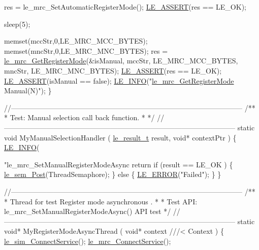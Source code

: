 \begin{DoxyCodeInclude}
{{{{{    res = le\_mrc\_SetAutomaticRegisterMode();
    \hyperlink{le__log_8h_ac0dbbef91dc0fed449d0092ff0557b39}{LE\_ASSERT}(res == LE\_OK);

    sleep(5);

    memset(mccStr,0,LE\_MRC\_MCC\_BYTES);
    memset(mncStr,0,LE\_MRC\_MNC\_BYTES);
    res = \hyperlink{le__mrc__interface_8h_a9ad2729c28e97ae450f7aee0865197f6}{le\_mrc\_GetRegisterMode}(&isManual, mccStr, LE\_MRC\_MCC\_BYTES, mncStr, 
      LE\_MRC\_MNC\_BYTES);
    \hyperlink{le__log_8h_ac0dbbef91dc0fed449d0092ff0557b39}{LE\_ASSERT}(res == LE\_OK);
    \hyperlink{le__log_8h_ac0dbbef91dc0fed449d0092ff0557b39}{LE\_ASSERT}(isManual == false);
    \hyperlink{le__log_8h_a23e6d206faa64f612045d688cdde5808}{LE\_INFO}("\hyperlink{le__mrc__interface_8h_a9ad2729c28e97ae450f7aee0865197f6}{le\_mrc\_GetRegisterMode} Manual(N)");
\}

\textcolor{comment}{//--------------------------------------------------------------------------------------------------}\textcolor{comment}{}
\textcolor{comment}{/**}
\textcolor{comment}{ * Test: Manual selection call back function.}
\textcolor{comment}{ *}
\textcolor{comment}{ */}
\textcolor{comment}{//--------------------------------------------------------------------------------------------------}
static \textcolor{keywordtype}{void} MyManualSelectionHandler
(
    \hyperlink{le__basics_8h_a1cca095ed6ebab24b57a636382a6c86c}{le\_result\_t} result,
    \textcolor{keywordtype}{void}* contextPtr
)
\{
    \hyperlink{le__log_8h_a23e6d206faa64f612045d688cdde5808}{LE\_INFO}(\textcolor{stringliteral}{"le\_mrc\_SetManualRegisterModeAsync return %
    \textcolor{keywordflow}{if} (result == LE\_OK )
    \{
        \hyperlink{le__semaphore_8h_abb859411cc58fbcc576c986ef52083b2}{le\_sem\_Post}(ThreadSemaphore);
    \}
    \textcolor{keywordflow}{else}
    \{
        \hyperlink{le__log_8h_a353590f91b3143a7ba3a416ae5a50c3d}{LE\_ERROR}(\textcolor{stringliteral}{"Failed"});
    \}
\}

\textcolor{comment}{//--------------------------------------------------------------------------------------------------}\textcolor{comment}{}
\textcolor{comment}{/**}
\textcolor{comment}{ * Thread for test Register mode asynchronous .}
\textcolor{comment}{ *}
\textcolor{comment}{ * Test API: le\_mrc\_SetManualRegisterModeAsync() API test}
\textcolor{comment}{ */}
\textcolor{comment}{//--------------------------------------------------------------------------------------------------}
\textcolor{keyword}{static} \textcolor{keywordtype}{void}* MyRegisterModeAsyncThread
(
    \textcolor{keywordtype}{void}* context   \textcolor{comment}{///< Context}
\textcolor{comment}{})
\{
    \hyperlink{le__sim__interface_8h_a84a7ff3ace6afa68bce12b85c18f9bf0}{le\_sim\_ConnectService}();
    \hyperlink{le__mrc__interface_8h_aa19103931ad3974ee014f0ce2705a4ff}{le\_mrc\_ConnectService}();

}}}}}}
\end{DoxyCodeInclude}
